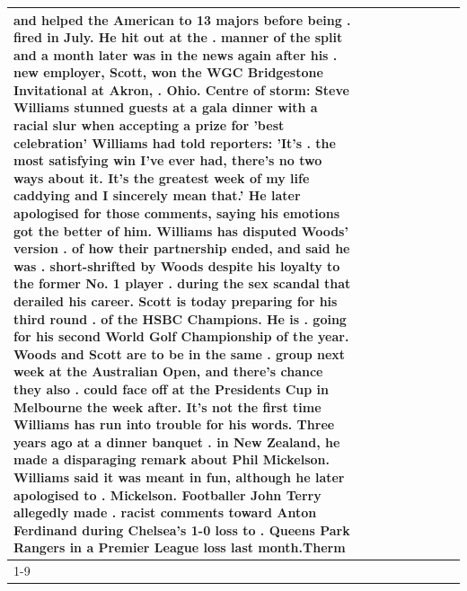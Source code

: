 \begin{table}[H]
\begin{tabular}{lllrlllll}
and helped the American to 13 majors before being . fired in July. He hit out at the . manner of the split and a month later was in the news again after his . new employer, Scott, won the WGC Bridgestone Invitational at Akron, . Ohio. Centre of storm: Steve Williams stunned guests at a gala dinner with a racial slur when accepting a prize for 'best celebration' Williams had told reporters: 'It's . the most satisfying win I've ever had, there's no two ways about it. It's the greatest week of my life caddying and I sincerely mean that.' He later apologised for those comments, saying his emotions got the better of him. Williams has disputed Woods' version . of how their partnership ended, and said he was . short-shrifted by Woods despite his loyalty to the former No. 1 player . during the sex scandal that derailed his career. Scott is today preparing for his third round . of the HSBC Champions. He is . going for his second World Golf Championship of the year. Woods and Scott are to be in the same . group next week at the Australian Open, and there's chance they also . could face off at the Presidents Cup in Melbourne the week after. It's not the first time Williams has run into trouble for his words. Three years ago at a dinner banquet . in New Zealand, he made a disparaging remark about Phil Mickelson. Williams said it was meant in fun, although he later apologised to . Mickelson. Footballer John Terry allegedly made . racist comments toward Anton Ferdinand during Chelsea's 1-0 loss to . Queens Park Rangers in a Premier League loss last month.Therm \\
\cline{1-9}

\end{tabular}
\end{table}
